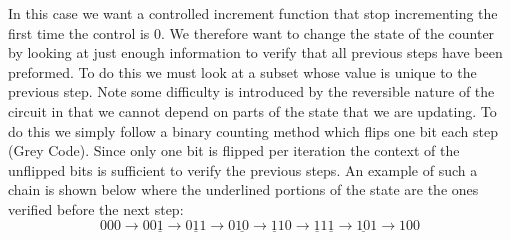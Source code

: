   In this case we want a controlled increment function that stop incrementing the first time the control is $0$.
  We therefore want to change the state of the counter by looking at just enough information to verify that all previous steps have been preformed.
  To do this we must look at a subset whose value is unique to the previous step.
  Note some difficulty is introduced by the reversible nature of the circuit in that we cannot depend on parts of the state that we are updating.
  To do this we simply follow a binary counting method which flips one bit each step (Grey Code).
  Since only one bit is flipped per iteration the context of the unflipped bits is sufficient to verify the previous steps. 
  An example of such a chain is shown below where the underlined portions of the state are the ones verified before the next step: 
  \[ 
    000 \to 00\underline{1} \to 0\underline{1}1 \to 0\underline{10} \to \underline{1}10 \to 
    \underline{1}1\underline{1} \to \underline{10}1 \to 100
  \]
